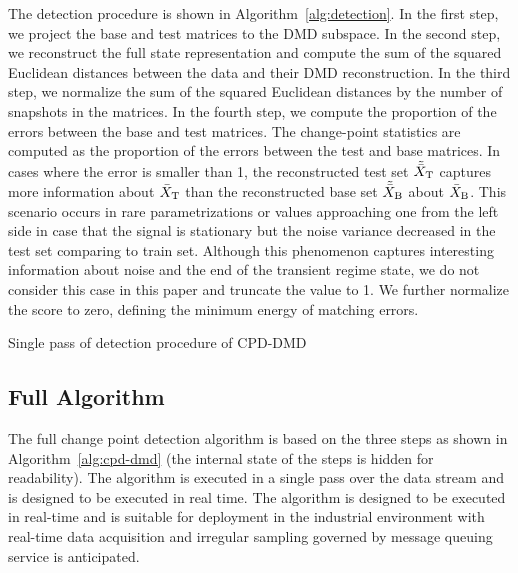 The detection procedure is shown in Algorithm~\ref{alg:detection}. In the first step, we project the base and test matrices to the DMD subspace. In the second step, we reconstruct the full state representation and compute the sum of the squared Euclidean distances between the data and their DMD reconstruction. In the third step, we normalize the sum of the squared Euclidean distances by the number of snapshots in the matrices. In the fourth step, we compute the proportion of the errors between the base and test matrices. The change-point statistics are computed as the proportion of the errors between the test and base matrices. In cases where the error is smaller than 1, the reconstructed test set \(\tilde{\bar{X}} _{\text{T}}\) captures more information about \(\bar{X} _{\text{T}}\) than the reconstructed base set \(\tilde{\bar{X}} _{\text{B}}\) about \(\bar{X} _{\text{B}}\). This scenario occurs in rare parametrizations or values approaching one from the left side in case that the signal is stationary but the noise variance decreased in the test set comparing to train set. Although this phenomenon captures interesting information about noise and the end of the transient regime state, we do not consider this case in this paper and truncate the value to 1. We further normalize the score to zero, defining the minimum energy of matching errors.


\begin{algorithm}
	\caption{Single pass of detection procedure of CPD-DMD}\label{alg:detection}
	\begin{algorithmic}[1]
	\end{algorithmic}
\end{algorithm}

\subsection{Full Algorithm}
The full change point detection algorithm is based on the three steps as shown in Algorithm~\ref{alg:cpd-dmd} (the internal state of the steps is hidden for readability). The algorithm is executed in a single pass over the data stream and is designed to be executed in real time. The algorithm is designed to be executed in real-time and is suitable for deployment in the industrial environment with real-time data acquisition and irregular sampling governed by message queuing service is anticipated.

